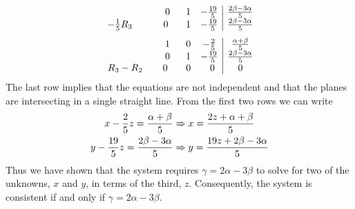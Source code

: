 \documentclass[12pt]{amsart}
\begin{document}
\begin{enumerate}
\begin{align}
\begin{array}{ccc|c}
				\hspace{1.95cm} \text{ } \text{ } 0& \text{ } \text{ } 1&-\frac{19}{5}& \frac{2\beta-3\alpha}{5} \\
				-\frac{1}{5}R_3 \text{ } \text{ } \hspace{0.9cm} 0& \text{ } \text{ } 1&-\frac{19}{5}& 
				\frac{2\beta-3\alpha}{5}
			\end{array} \notag
		\end{align} 
		\begin{align}
			\begin{array}{ccc|c}
				\hspace{1.95cm} \text{ } \text{ } 1&\text{ } \text{ } 0& -\frac{2}{5}& \frac{\alpha+\beta}{5}\\
				\hspace{1.95cm} \text{ } \text{ } 0& \text{ } \text{ } 1&-\frac{19}{5}& \frac{2\beta-3\alpha}{5} \\
				R_3-R_2 \hspace{0.5cm} \text{ } \text{ } 0& \text{ } \text{ } 0& \text{ } \text{ } 0& 0
			\end{array} \notag
		\end{align} 
		The last row implies that the equations are not independent and that the planes are intersecting in 			a single straight line. From the first two rows we can write
		\begin{align}
			x-\frac{2}{5}z = \frac{\alpha+\beta}{5} &\Rightarrow x=\frac{2z+\alpha+\beta}{5} \notag \\
			y-\frac{19}{5}z  = \frac{2\beta-3\alpha}{5} &\Rightarrow y=\frac{19z+2\beta-3\alpha}{5} \notag
		\end{align} 
		Thus we have shown that the system requires $\gamma=2\alpha-3\beta$ to solve for two of the 			unknowns, $x$ and $y$, in terms of the third, $z$. Consequently, the system is consistent if and 			only if $\gamma=2\alpha-3\beta$. \\
		

\end{enumerate}
\end{document}
